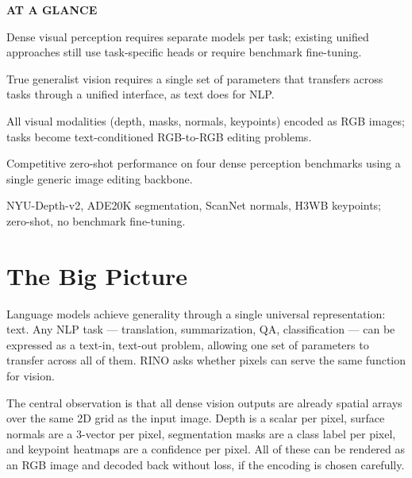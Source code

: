 \documentclass[10pt,twocolumn]{article}
\begin{document}
\begin{mdframed}[backgroundcolor=boxgray,linecolor=rulered,linewidth=1pt,
    innerleftmargin=6pt,innerrightmargin=6pt,
    innertopmargin=6pt,innerbottommargin=6pt]
\textbf{\small AT A GLANCE}\par\vspace{4pt}
\begin{description}[leftmargin=0pt,labelsep=4pt,itemsep=2pt,parsep=0pt,
    font=\small\bfseries]
  \item[Problem:] Dense visual perception requires separate models per
    task; existing unified approaches still use task-specific heads or
    require benchmark fine-tuning.
  \item[Why it matters:] True generalist vision requires a single set
    of parameters that transfers across tasks through a unified
    interface, as text does for NLP.
  \item[Method:] All visual modalities (depth, masks, normals,
    keypoints) encoded as RGB images; tasks become text-conditioned
    RGB-to-RGB editing problems.
  \item[Result:] Competitive zero-shot performance on four dense
    perception benchmarks using a single generic image editing backbone.
  \item[Evidence:] NYU-Depth-v2, ADE20K segmentation, ScanNet normals,
    H3WB keypoints; zero-shot, no benchmark fine-tuning.
\end{description}
\end{mdframed}

\section{The Big Picture}

Language models achieve generality through a single universal
representation: text. Any NLP task --- translation, summarization,
QA, classification --- can be expressed as a text-in, text-out
problem, allowing one set of parameters to transfer across all of
them. RINO asks whether pixels can serve the same function for
vision.

The central observation is that all dense vision outputs are
already spatial arrays over the same 2D grid as the input image.
Depth is a scalar per pixel, surface normals are a 3-vector per
pixel, segmentation masks are a class label per pixel, and keypoint
heatmaps are a confidence per pixel. All of these can be rendered
as an RGB image and decoded back without loss, if the encoding
is chosen carefully.
\end{document}
